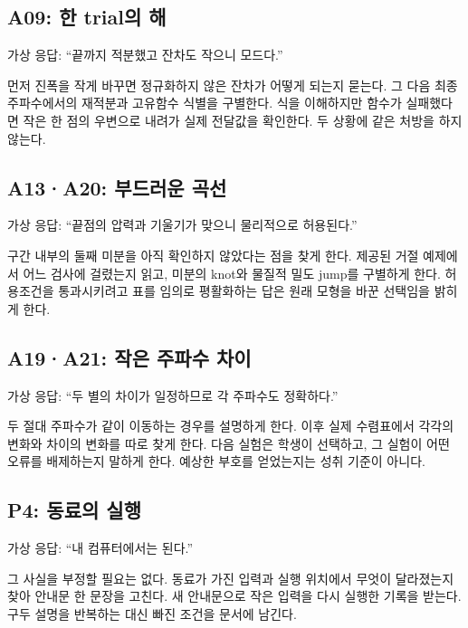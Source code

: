 \documentclass[
  10pt,
  a4paper,
]{article}
\begin{document}
\subsection{A09: 한 trial의 해}\label{a09-uxd55c-trialuxc758-uxd574}

가상 응답: ``끝까지 적분했고 잔차도 작으니 모드다.''

먼저 진폭을 작게 바꾸면 정규화하지 않은 잔차가 어떻게 되는지 묻는다. 그
다음 최종 주파수에서의 재적분과 고유함수 식별을 구별한다. 식을
이해하지만 함수가 실패했다면 작은 한 점의 우변으로 내려가 실제 전달값을
확인한다. 두 상황에 같은 처방을 하지 않는다.

\subsection{A13·A20: 부드러운
곡선}\label{a13a20-uxbd80uxb4dcuxb7ecuxc6b4-uxace1uxc120}

가상 응답: ``끝점의 압력과 기울기가 맞으니 물리적으로 허용된다.''

구간 내부의 둘째 미분을 아직 확인하지 않았다는 점을 찾게 한다. 제공된
거절 예제에서 어느 검사에 걸렸는지 읽고, 미분의 knot와 물질적 밀도
jump를 구별하게 한다. 허용조건을 통과시키려고 표를 임의로 평활화하는
답은 원래 모형을 바꾼 선택임을 밝히게 한다.

\subsection{A19·A21: 작은 주파수
차이}\label{a19a21-uxc791uxc740-uxc8fcuxd30cuxc218-uxcc28uxc774}

가상 응답: ``두 별의 차이가 일정하므로 각 주파수도 정확하다.''

두 절대 주파수가 같이 이동하는 경우를 설명하게 한다. 이후 실제
수렴표에서 각각의 변화와 차이의 변화를 따로 찾게 한다. 다음 실험은
학생이 선택하고, 그 실험이 어떤 오류를 배제하는지 말하게 한다. 예상한
부호를 얻었는지는 성취 기준이 아니다.

\subsection{P4: 동료의 실행}\label{p4-uxb3d9uxb8ccuxc758-uxc2e4uxd589}

가상 응답: ``내 컴퓨터에서는 된다.''

그 사실을 부정할 필요는 없다. 동료가 가진 입력과 실행 위치에서 무엇이
달라졌는지 찾아 안내문 한 문장을 고친다. 새 안내문으로 작은 입력을 다시
실행한 기록을 받는다. 구두 설명을 반복하는 대신 빠진 조건을 문서에
남긴다.
\end{document}

